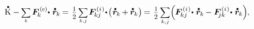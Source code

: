 \nopagebreak\vspace{-0.3em}
\begin{equation*}
\mathdotabove{\kineticenergyinmechanics} \hspace{.1ex}
- \hspace{-0.1ex}
\scalebox{.8}{$ \displaystyle \sum_{\smash{k}} $} \hspace{.3ex}
\bm{F}^{\smthexternal}_{\hspace{-0.16ex}k} \hspace{-0.4ex} \dotp \hspace{.1ex} \mathdotabove{\locationvector}_{\hspace{-0.1ex}k}
\hspace{-0.2ex} = \hspace{.2ex}
\smalldisplaystyleonehalf \hspace{.3ex} \scalebox{.8}{$ \displaystyle \sum_{\smash{k,\hspace{.1ex}j}} $}
\hspace{.2ex} \bm{F}^{\smthinternal}_{\hspace{-0.16ex}kj} \hspace{-0.3ex} \dotp \hspace{-0.3ex}
\bigl( \hspace{.1ex} \mathdotabove{\locationvector}_{\hspace{-0.1ex}k} \hspace{-0.2ex} + \hspace{-0.1ex} \mathdotabove{\locationvector}_{\hspace{-0.1ex}k} \bigr)
\hspace{-0.2ex} = \hspace{.2ex}
\smalldisplaystyleonehalf \hspace{.3ex} \scalebox{.85}[.9]{$ \displaystyle \sum_{\smash{k,\hspace{.1ex}j}} $}
\Bigl( \hspace{-0.1ex}
\bm{F}^{\smthinternal}_{\hspace{-0.16ex}kj} \hspace{-0.3ex} \dotp \hspace{.1ex}
\mathdotabove{\locationvector}_{\hspace{-0.1ex}k}
\hspace{-0.2ex} -
\bm{F}^{\smthinternal}_{\hspace{-0.4ex}jk} \hspace{-0.3ex} \dotp \hspace{.1ex}
\mathdotabove{\locationvector}_{\hspace{-0.1ex}k}
\hspace{-0.1ex} \Bigr)
\hspace{-0.1ex} ,
\end{equation*}

